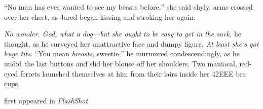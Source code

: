 ``No man has ever wanted to see my beasts before,'' she said shyly, arms
crossed over her chest, as Jared began kissing and stroking her again.

\emph{No wonder. God, what a dog---but she ought to be easy to get in
the sack,} he thought, as he surveyed her unattractive face and dumpy
figure. \emph{At least she's got huge tits.} ``You mean \emph{breasts,}
sweetie,'' he murmured condescendingly, as he undid the last buttons and
slid her blouse off her shoulders. Two maniacal, red-eyed ferrets
launched themselves at him from their lairs inside her 42EEE bra cups.

first appeared in \emph{FlashShot}
